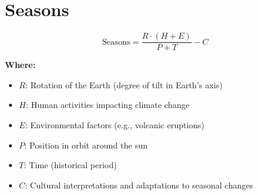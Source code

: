 \chapter{Seasons}

\begin{equation}
\text{Seasons} = \frac{R \cdot (H + E)}{P + T} - C
\end{equation}

\textbf{Where:}

\begin{itemize}
    \item $R$: Rotation of the Earth (degree of tilt in Earth's axis)
    \item $H$: Human activities impacting climate change
    \item $E$: Environmental factors (e.g., volcanic eruptions)
    \item $P$: Position in orbit around the sun
    \item $T$: Time (historical period)
    \item $C$: Cultural interpretations and adaptations to seasonal changes
\end{itemize}